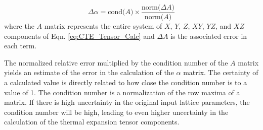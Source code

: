 \begin{equation}
 \Delta \alpha = \text{cond(}A\text{)} \times \frac{\text{norm(}\Delta A\text{)}}{\text{norm(}A\text{)}}
 \label{eq:uncertainty_tensor}
\end{equation}
where the $A$ matrix represents the entire system of $X$, $Y$, $Z$, $XY$, $YZ$, and $XZ$ components of Eqn. \ref{eq:CTE_Tensor_Calc} and $\Delta A$ is the associated error in each term.  

The normalized relative error multiplied by the condition number of the $A$ matrix yields an estimate of the error in the calculation of the $\alpha$ matrix.  The certainty of a calculated value is directly related to how close the condition number is to a value of 1.  The condition number is a normalization of the row maxima of a matrix.  If there is high uncertainty in the original input lattice parameters, the condition number will be high, leading to even higher uncertainty in the calculation of the thermal expansion tensor components.